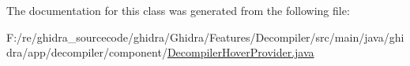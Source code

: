 The documentation for this class was generated from the following file\+:\begin{DoxyCompactItemize}
\item 
F\+:/re/ghidra\+\_\+sourcecode/ghidra/\+Ghidra/\+Features/\+Decompiler/src/main/java/ghidra/app/decompiler/component/\mbox{\hyperlink{_decompiler_hover_provider_8java}{Decompiler\+Hover\+Provider.\+java}}\end{DoxyCompactItemize}
